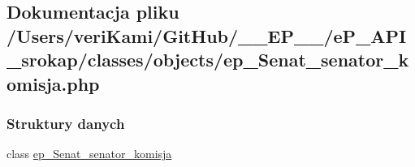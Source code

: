 \hypertarget{ep___senat__senator__komisja_8php}{\subsection{Dokumentacja pliku /\-Users/veri\-Kami/\-Git\-Hub/\-\_\-\-\_\-\-E\-P\-\_\-\-\_\-/e\-P\-\_\-\-A\-P\-I\-\_\-srokap/classes/objects/ep\-\_\-\-Senat\-\_\-senator\-\_\-komisja.php}
\label{ep___senat__senator__komisja_8php}
}
\subsubsection*{Struktury danych}
\begin{DoxyCompactItemize}
\item 
class \hyperlink{classep___senat__senator__komisja}{ep\-\_\-\-Senat\-\_\-senator\-\_\-komisja}
\end{DoxyCompactItemize}
